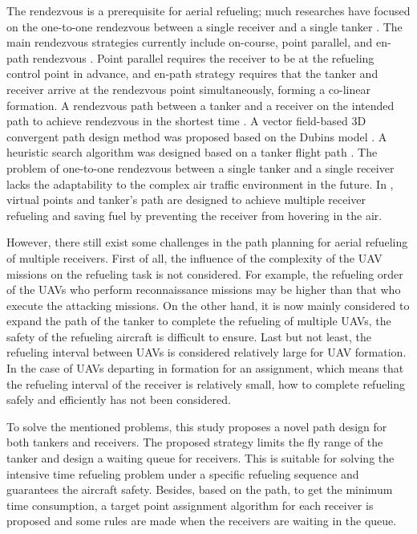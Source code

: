 The rendezvous is a prerequisite for aerial refueling; much researches have focused on the one-to-one rendezvous between a single receiver and a single tanker \cite{b3,b4,b5,b6}. The main rendezvous strategies currently include on-course, point parallel, and en-path rendezvous \cite{b2}. Point parallel requires the receiver to be at the refueling control point in advance, and en-path strategy requires that the tanker and receiver arrive at the rendezvous point simultaneously, forming a co-linear formation. A rendezvous path between a tanker and a receiver on the intended path to achieve rendezvous in the shortest time \cite{b3,b4}. A vector field-based 3D convergent path design method was proposed based on the Dubins model \cite{b5}. A heuristic search algorithm was designed based on a tanker flight path \cite{b6}. The problem of one-to-one rendezvous between a single tanker and a single receiver lacks the adaptability to the complex air traffic environment in the future. In \cite{b7}, virtual points and tanker's path are designed to achieve multiple receiver refueling and saving fuel by preventing the receiver from hovering in the air. 

However, there still exist some challenges in the path planning for aerial refueling of multiple receivers.
First of all, the influence of the complexity of the UAV missions on the refueling task is not considered.
For example, the refueling order of the UAVs who perform reconnaissance missions may be higher than that who execute the attacking missions. 
On the other hand, it is now mainly considered to expand the path of the tanker to complete the refueling of multiple UAVs, the safety of the refueling aircraft is difficult to ensure. 
Last but not least, the refueling interval between UAVs is considered relatively large for UAV formation. In the case of UAVs departing in formation for an assignment, which means that the refueling interval of the receiver is relatively small, how to complete refueling safely and efficiently has not been considered.

To solve the mentioned problems, this study proposes a novel path design for both  tankers and receivers. The proposed strategy limits the fly range of the tanker and design a waiting queue for receivers. This is suitable for solving the intensive time refueling problem under a specific refueling sequence and guarantees the aircraft safety. Besides, based on the path, to get the minimum time consumption, a target point assignment algorithm for each receiver is proposed and some rules are made when the receivers are waiting in the queue.


